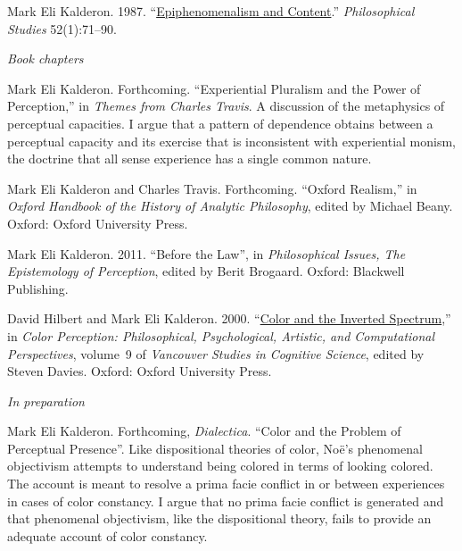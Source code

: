 \documentclass[11pt]{article}
\begin{document}
\ind Mark Eli Kalderon. 1987.
``\href{http://www.jstor.org/stable/4319905}{Epiphenomenalism and Content}.'' \emph{Philosophical Studies} 52(1):71--90.

\bigskip

\noindent\emph{Book chapters \vspace{0.05in}}

\ind Mark Eli Kalderon. Forthcoming. ``Experiential Pluralism and the Power of Perception,'' in \emph{Themes from Charles Travis}. A discussion of the metaphysics of perceptual capacities. I argue that a pattern of dependence obtains between a perceptual capacity and its exercise that is inconsistent with experiential monism, the doctrine that all sense experience has a single common nature.

\ind Mark Eli Kalderon and Charles Travis. Forthcoming. ``Oxford Realism,''  in \emph{Oxford Handbook of the History of Analytic Philosophy}, edited by Michael Beany. Oxford: Oxford University Press.

\ind Mark Eli Kalderon. 2011. ``Before the Law'', in \emph{Philosophical Issues, The Epistemology of Perception}, edited by Berit Brogaard. Oxford: Blackwell Publishing.

\ind David Hilbert and Mark Eli Kalderon. 2000. ``\href{http://markelikalderon.com/wp-content/uploads/2006/09/cis.pdf}{Color and the Inverted Spectrum},'' in \emph{Color Perception: Philosophical, Psychological, Artistic, and Computational Perspectives}, volume~9 of \emph{Vancouver Studies in Cognitive Science}, edited by Steven Davies. Oxford: Oxford University Press.


\bigskip 

 
\noindent\emph{In preparation \vspace{0.05in}}


\ind Mark Eli Kalderon. Forthcoming, \emph{Dialectica}. ``Color and the Problem of Perceptual Presence''. Like dispositional theories of color, Noë's phenomenal objectivism attempts to understand being colored in terms of looking colored. The account is meant to resolve a prima facie conflict in or between experiences in cases of color constancy. I argue that no prima facie conflict is generated and that phenomenal objectivism, like the dispositional theory, fails to provide an adequate account of color constancy.
\end{document}
